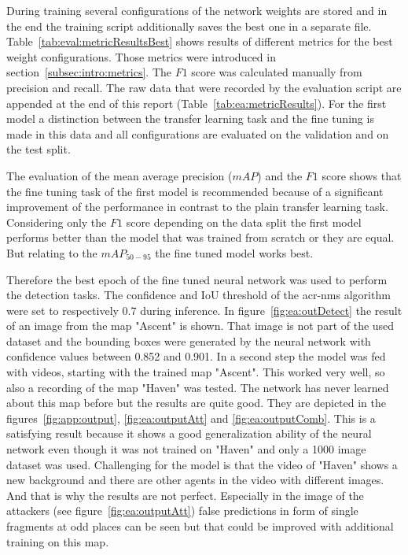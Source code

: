 During training several configurations of the network weights are stored and in the end the training 
script additionally saves the best one in a separate file. Table~\ref{tab:eval:metricResultsBest} 
shows results of different metrics for the best weight configurations. Those metrics were introduced 
in section~\ref{subsec:intro:metrics}. The $F1$ score was calculated manually from precision 
and recall. The raw data that were recorded by the evaluation script are appended at the end of this 
report (Table~\ref{tab:ea:metricResults}). For the first model a distinction between the transfer 
learning task and the fine tuning is made in this data and all configurations are evaluated on the 
validation and on the test split. 

The evaluation of the mean average precision ($mAP$) and the $F1$ score shows that the fine 
tuning task of the first model is recommended because of a significant improvement of the 
performance in contrast to the plain transfer learning task. Considering only the $F1$ score 
depending on the data split the first model performs better than the model that was trained from 
scratch or they are equal. But relating to the $mAP_{50-95}$ the fine tuned model works best.

Therefore the best epoch of the fine tuned neural network was used to perform the detection tasks. 
The confidence and IoU threshold of the \gls{acr-nms} algorithm were set to respectively 0.7 during 
inference. In figure~\ref{fig:ea:outDetect} the result of an image from the map "Ascent" is shown. 
That image is not part of the used dataset and the bounding boxes were generated by the neural 
network with confidence values between 0.852 and 0.901. In a second step the model was fed with 
videos, starting with the trained map "Ascent". This worked very well, so also a recording of the map 
"Haven" was tested. The network has never learned about this map before but the results 
are quite good. They are depicted in the figures~\ref{fig:app:output}, \ref{fig:ea:outputAtt} and 
\ref{fig:ea:outputComb}. This is a satisfying result because it shows a good generalization ability of 
the neural network even though it was not trained on "Haven" and only a 1000 image dataset was 
used. Challenging for the model is that the video of "Haven" shows a new background and there are 
other agents in the video with different images. And that is why the results are not perfect. Especially 
in the image of the attackers (see figure~\ref{fig:ea:outputAtt}) false predictions in form of single 
fragments at odd places can be seen but that could be improved with additional training on this map.

